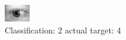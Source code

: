 \begin{figure}[h!]
\begin{center}
\includegraphics[width=0.60\columnwidth]{figures/ID799_class_2_target_4.png}
\end{center}
\caption{ Classification: 2 actual target: 4}
\label{fig:ID799_class_2_target_4}
\end{figure}
